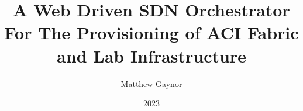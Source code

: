 \documentclass[bsc]{abdnthesis}
\title{A Web Driven SDN Orchestrator For The Provisioning of ACI Fabric and Lab
  Infrastructure}
\author{Matthew Gaynor}
\date{2023}
\begin{document}

\maketitle
\makedeclaration











\newcommand{\autorefp}[1]{\autoref{#1} (p\pageref*{#1})}

\newcommand{\autorefnp}[1]{\autoref{#1} ``\nameref{#1}'', (p\pageref*{#1})}

\newcommand{\see}[1]{\hyperref[#1]{(see \autoref*{#1}, p\pageref*{#1})}}

\newcommand{\seenamed}[1]{\hyperref[#1]{(see \autoref*{#1} ``\nameref*{#1}'',
    p.\pageref*{#1})}}

\newcommand{\bq}[2][]{\singlespacing \begin{quote}
    \begin{small} ``\textit{#2}'' \end{small} #1 \end{quote} \doublespacing}

\newcommand{\qq}[1]{{\enquote{\textit{#1}}}}
\end{document}
